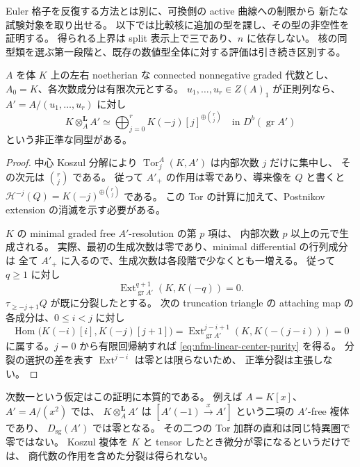 Euler 格子を反復する方法とは別に、可換側の active 曲線への制限から
新たな試験対象を取り出せる。
以下では比較核に追加の型を課し、その型の非空性を証明する。
得られる上界は split 表示上で三であり、$n$ に依存しない。
核の同型類を選ぶ第一段階と、既存の数値型全体に対する評価は引き続き区別する。

\begin{lemma}[次数一の中心列に対する残余体の分裂]
\label{lem:nfm-linear-center-purity}
$A$ を体 $K$ 上の左右 noetherian な connected nonnegative graded 代数とし、
$A_0=K$、各次数成分は有限次元とする。
$u_1,\ldots,u_r\in Z(A)_1$ が正則列なら、$A'=A/(u_1,\ldots,u_r)$ に対し
\begin{equation}
\label{eq:nfm-linear-center-purity}
 K\otimes_A^{\mathbf L}A'
 \simeq
 \bigoplus_{j=0}^{r}K(-j)[j]^{\oplus\binom rj}
 \quad\text{in }D^b(\operatorname{gr}A')
\end{equation}
という非正準な同型がある。
\end{lemma}

\begin{proof}
中心 Koszul 分解により
$\operatorname{Tor}_j^A(K,A')$ は内部次数 $j$ だけに集中し、
その次元は $\binom rj$ である。
従って $A'_+$ の作用は零であり、導来像を $Q$ と書くと
$\mathcal H^{-j}(Q)=K(-j)^{\oplus\binom rj}$ である。
この Tor の計算に加えて、Postnikov extension の消滅を示す必要がある。

$K$ の minimal graded free $A'$-resolution の第 $p$ 項は、
内部次数 $p$ 以上の元で生成される。
実際、最初の生成次数は零であり、minimal differential の行列成分は
全て $A'_+$ に入るので、生成次数は各段階で少なくとも一増える。
従って $q\ge1$ に対し
\[
 \operatorname{Ext}^{q+1}_{\operatorname{gr}A'}(K,K(-q))=0.
\]
$\tau_{\ge-j+1}Q$ が既に分裂したとする。
次の truncation triangle の attaching map の各成分は、$0\le i<j$ に対し
\[
 \operatorname{Hom}\bigl(K(-i)[i],K(-j)[j+1]\bigr)
 =
 \operatorname{Ext}^{j-i+1}_{\operatorname{gr}A'}
       (K,K(-(j-i)))
 =0
\]
に属する。$j=0$ から有限回帰納すれば \eqref{eq:nfm-linear-center-purity} を得る。
分裂の選択の差を表す $\operatorname{Ext}^{j-i}$ は零とは限らないため、
正準分裂は主張しない。
\end{proof}

次数一という仮定はこの証明に本質的である。
例えば $A=K[x]$、$A'=A/(x^2)$ では、
$K\otimes_A^{\mathbf L}A'$ は
$[A'(-1)\xrightarrow{x}A']$ という二項の $A'$-free 複体であり、
$D_{\mathrm{sg}}(A')$ では零となる。
その二つの Tor 加群の直和は同じ特異圏で零ではない。
Koszul 複体を $K$ と tensor したとき微分が零になるというだけでは、
商代数の作用を含めた分裂は得られない。

